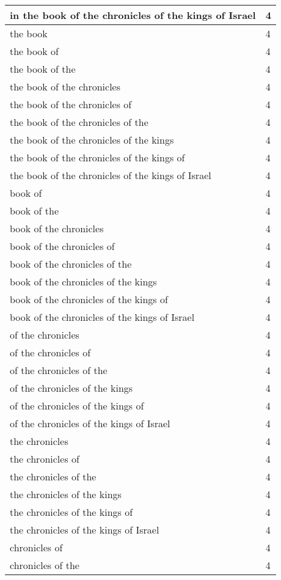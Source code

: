 \begin{center}
\begin{longtable}{|p{3.0in}|p{0.5in}|}
in the book of the chronicles of the kings of Israel & 4\\ \hline 
the book & 4\\ \hline 
the book of & 4\\ \hline 
the book of the & 4\\ \hline 
the book of the chronicles & 4\\ \hline 
the book of the chronicles of & 4\\ \hline 
the book of the chronicles of the & 4\\ \hline 
the book of the chronicles of the kings & 4\\ \hline 
the book of the chronicles of the kings of & 4\\ \hline 
the book of the chronicles of the kings of Israel & 4\\ \hline 
book of & 4\\ \hline 
book of the & 4\\ \hline 
book of the chronicles & 4\\ \hline 
book of the chronicles of & 4\\ \hline 
book of the chronicles of the & 4\\ \hline 
book of the chronicles of the kings & 4\\ \hline 
book of the chronicles of the kings of & 4\\ \hline 
book of the chronicles of the kings of Israel & 4\\ \hline 
of the chronicles & 4\\ \hline 
of the chronicles of & 4\\ \hline 
of the chronicles of the & 4\\ \hline 
of the chronicles of the kings & 4\\ \hline 
of the chronicles of the kings of & 4\\ \hline 
of the chronicles of the kings of Israel & 4\\ \hline 
the chronicles & 4\\ \hline 
the chronicles of & 4\\ \hline 
the chronicles of the & 4\\ \hline 
the chronicles of the kings & 4\\ \hline 
the chronicles of the kings of & 4\\ \hline 
the chronicles of the kings of Israel & 4\\ \hline 
chronicles of & 4\\ \hline 
chronicles of the & 4\\ \hline 

\end{longtable}
\end{center}
